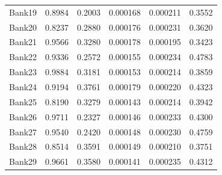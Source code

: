 \begin{longtable}{@{}lrrrrr@{}}
Bank19 & 0.8984 & 0.2003 & 0.000168 & 0.000211 & 0.3552 \\
Bank20 & 0.8237 & 0.2880 & 0.000176 & 0.000231 & 0.3620 \\
Bank21 & 0.9566 & 0.3280 & 0.000178 & 0.000195 & 0.3423 \\
Bank22 & 0.9336 & 0.2572 & 0.000155 & 0.000234 & 0.4783 \\
Bank23 & 0.9884 & 0.3181 & 0.000153 & 0.000214 & 0.3859 \\
Bank24 & 0.9194 & 0.3761 & 0.000179 & 0.000220 & 0.4323 \\
Bank25 & 0.8190 & 0.3279 & 0.000143 & 0.000214 & 0.3942 \\
Bank26 & 0.9711 & 0.2327 & 0.000146 & 0.000233 & 0.4300 \\
Bank27 & 0.9540 & 0.2420 & 0.000148 & 0.000230 & 0.4759 \\
Bank28 & 0.8514 & 0.3591 & 0.000149 & 0.000210 & 0.3751 \\
Bank29 & 0.9661 & 0.3580 & 0.000141 & 0.000235 & 0.4312 \\
\end{longtable}

\endgroup
\endinput

\section{Archived GitHub Central-Policy File (Not Used in the Formal Sample)}

The following tables reproduce a separately supplied GitHub
central-policy initialization. The values differ from the shared current
file and were not used to generate the Chapter~7 results. They are
retained only for completeness of the data archive.

